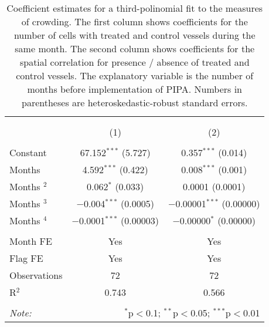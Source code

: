 
\begin{table}[!htbp] \centering 
  \caption{\label{tab:main_DID}Coefficient estimates for a third-polinomial fit to the measures of crowding. The first column shows coefficients for the number of cells with treated and control vessels during the same month. The second column shows coefficients for the spatial correlation for presence / absence of treated and control vessels. The explanatory variable is the number of months before implementation of PIPA. Numbers in parentheses are heteroskedastic-robust standard errors.} 
  \label{} 
\footnotesize 
\begin{tabular}{@{\extracolsep{1pt}}lcc} 
\\[-1.8ex]\hline 
\hline \\[-1.8ex] 
\\[-1.8ex] & (1) & (2)\\ 
\hline \\[-1.8ex] 
 Constant & 67.152$^{***}$ (5.727) & 0.357$^{***}$ (0.014) \\ 
  Months & 4.592$^{***}$ (0.422) & 0.008$^{***}$ (0.001) \\ 
  Months $^2$ & 0.062$^{*}$ (0.033) & 0.0001 (0.0001) \\ 
  Months $^3$ & $-$0.004$^{***}$ (0.0005) & $-$0.00001$^{***}$ (0.00000) \\ 
  Months $^4$ & $-$0.0001$^{***}$ (0.00003) & $-$0.00000$^{*}$ (0.00000) \\ 
 \hline \\[-1.8ex] 
Month FE & Yes & Yes \\ 
Flag FE & Yes & Yes \\ 
Observations & 72 & 72 \\ 
R$^{2}$ & 0.743 & 0.566 \\ 
\hline 
\hline \\[-1.8ex] 
\textit{Note:}  & \multicolumn{2}{r}{$^{*}$p$<$0.1; $^{**}$p$<$0.05; $^{***}$p$<$0.01} \\ 
\end{tabular} 
\end{table} 
